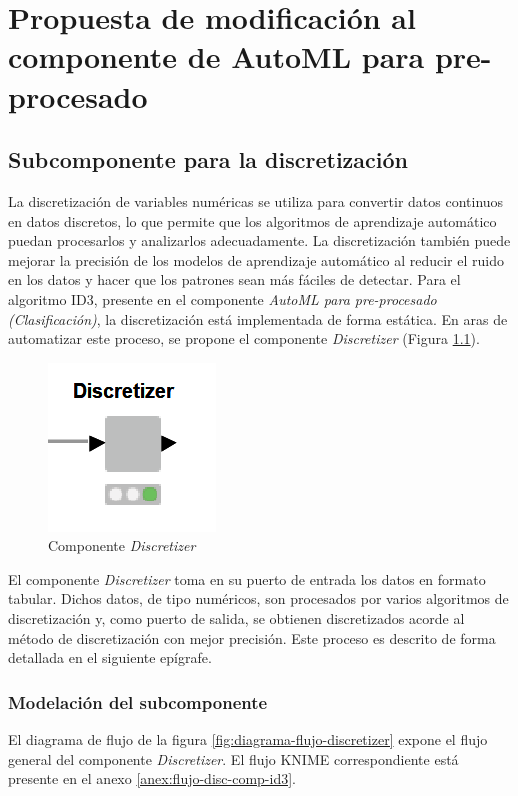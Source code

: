 \chapter{Propuesta de modificación al componente de AutoML para pre-procesado}\label{chap:2}



\section{Subcomponente para la discretización}
La discretización de variables numéricas se utiliza para convertir datos continuos en datos discretos, lo que permite que los algoritmos de aprendizaje automático puedan procesarlos y analizarlos adecuadamente. La discretización también puede mejorar la precisión de los modelos de aprendizaje automático al reducir el ruido en los datos y hacer que los patrones sean más fáciles de detectar. Para el algoritmo ID3, presente en el componente \textit{AutoML para pre-procesado (Clasificación)}, la discretización está implementada de forma estática. En aras de automatizar este proceso, se propone el componente \textit{Discretizer} (Figura \ref{fig:subcomp-disc}).

\begin{figure}[H]
	\centering
	\includegraphics[width=0.15\linewidth]{"figuras/capi 2/subcomp-disc"}
	\caption[Componente Discretizer]{Componente \textit{Discretizer}}
	\label{fig:subcomp-disc}
\end{figure}

El componente \textit{Discretizer} toma en su puerto de entrada los datos en formato tabular. Dichos datos, de tipo numéricos, son procesados por varios algoritmos de discretización y, como puerto de salida, se obtienen discretizados acorde al método de discretización con mejor precisión. Este proceso es descrito de forma detallada en el siguiente epígrafe.


\subsection{Modelación del subcomponente}
El diagrama de flujo de la figura \ref{fig:diagrama-flujo-discretizer} expone el flujo general del componente \textit{Discretizer}. El flujo KNIME correspondiente está presente en el anexo \ref{anex:flujo-disc-comp-id3}.

